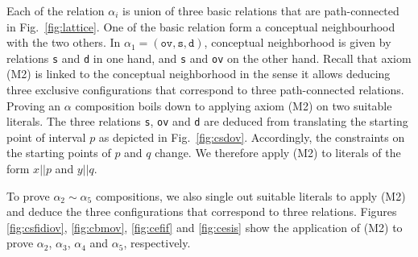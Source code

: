 \documentclass{llncs}
\begin{document}
Each of the relation $\alpha_i$ is union of three basic relations that are path-connected in  Fig.~\ref{fig:lattice}. One of the basic relation form a conceptual neighbourhood with the two others. In $\alpha_1 = (\texttt{ov}, \texttt{s}, \texttt{d})$, conceptual neighborhood is given by relations \texttt{s} and \texttt{d} in one hand, and \texttt{s} and \texttt{ov} on the other hand. Recall that axiom (M2) is linked to the conceptual neighborhood in the sense it allows deducing three exclusive configurations that correspond to  three path-connected relations.  Proving an $\alpha$ composition boils down to applying axiom (M2) on two suitable literals.  %
%
The three relations \texttt{s}, \texttt{ov} and \texttt{d} are deduced from translating the starting point of interval $p$ as depicted in Fig.~\ref{fig:csdov}. Accordingly, the constraints on the starting points of $p$ and $q$ change. We therefore apply (M2) to literals of the form $x||p$ and $y||q$. 

To prove $\alpha_2 \sim \alpha_5$ compositions, we also single out suitable literals to apply (M2) and deduce the three configurations that correspond to  three relations. %
Figures \ref{fig:csfidiov}, \ref{fig:cbmov}, \ref{fig:cefif} and \ref{fig:cesis} show the application of (M2) to prove $\alpha_2$, $\alpha_3$, $\alpha_4$ and $\alpha_5$, respectively. 
\end{document}
